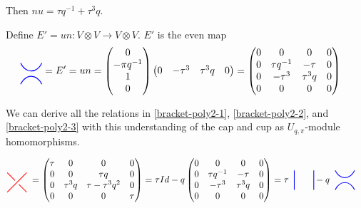 \documentclass{amsart}
\newcommand{\hackcenter}[1]{
 \xy (0,0)*{#1}; \endxy}
\theoremstyle{plain}
\theoremstyle{definition}
\theoremstyle{definition}
\numberwithin{equation}{section}
\numberwithin{theorem}{section}
\renewcommand{\to}{\rightarrow}
\numberwithin{equation}{section}
\begin{document}
Then $nu=\tau q^{-1}+\tau^3 q$.

Define $E'= un: V\otimes V\to V\otimes V$. $E'$ is the even map
\begin{align*}
  \hackcenter{ \begin{tikzpicture} [scale=.75]
\draw[thick,   blue] (0,0).. controls ++(.25,.5) and ++(-.25,.5).. (1,0);
\draw[thick,   blue] (0,1).. controls ++(.25,-.5) and ++(-.25,-.5).. (1,1);
\end{tikzpicture}} &= E'= un =
\begin{pmatrix}
     0\\
     -\pi q^{-1}\\
     1 \\
     0
  \end{pmatrix}
\begin{pmatrix}
     0 & -\tau^3 & \tau^3q & 0
  \end{pmatrix}
=
\begin{pmatrix}
  0 & 0 & 0 & 0 \\
  0 & \tau q^{-1} & -\tau & 0 \\
  0 & -\tau^3 & \tau^3 q  & 0 \\
  0 & 0 & 0 & 0
\end{pmatrix}
\end{align*}

We can derive all the relations in \eqref{bracket-poly2-1}, \eqref{bracket-poly2-2}, and \eqref{bracket-poly2-3} with this understanding of the cap and cup as $U_{q,\pi}$-module homomorphisms.

\begin{align*}
\hackcenter{ \begin{tikzpicture} [scale=.75]
\draw[thick, red, -] (0,0) to (1,1);
\draw[thick, red, -] (1,0) to (.6,.4);
\draw[thick, red, -] (0,1) to (.4,.6);
\end{tikzpicture}} \;=
 \begin{pmatrix}
\tau & 0 & 0 & 0 \\
0 & 0 & \tau q & 0 \\
0 & \tau^3q & \tau-\tau^3q^2 & 0 \\
0 & 0 & 0 & \tau
\end{pmatrix}&=
\tau Id-q
\begin{pmatrix}
  0 & 0 & 0 & 0 \\
  0 & \tau q^{-1} & -\tau & 0 \\
  0 & -\tau^3 & \tau^3 q  & 0 \\
  0 & 0 & 0 & 0
\end{pmatrix}=
\tau\;\;
\hackcenter{ \begin{tikzpicture} [scale=.75]
\draw[thick,   blue] (0,0) to (0,1);
\draw[thick,   blue] (1,0) to (1,1);
\end{tikzpicture}}
-q\;\;
\hackcenter{ \begin{tikzpicture} [scale=.75]
\draw[thick,   blue] (0,0).. controls ++(.25,.5) and ++(-.25,.5).. (1,0);
\draw[thick,   blue] (0,1).. controls ++(.25,-.5) and ++(-.25,-.5).. (1,1);
\end{tikzpicture}}
\end{align*}
\end{document}
